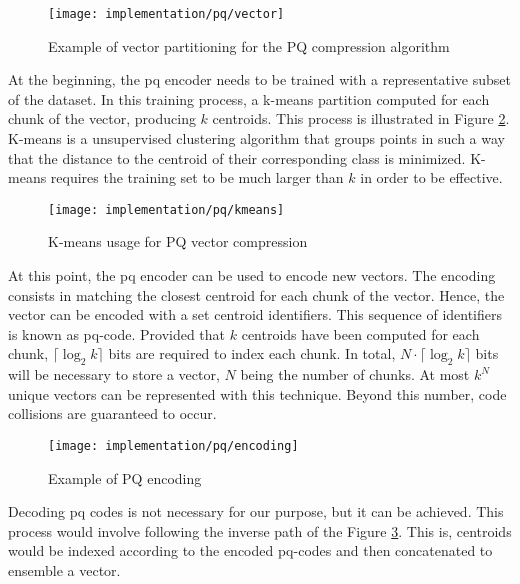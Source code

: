 \documentclass[../main.tex]{subfiles}
\begin{document}
\begin{figure}[htbp]
    \centering
    \texttt{[image: implementation/pq/vector]}
    \caption{Example of vector partitioning for the PQ compression algorithm}
    \label{fig:4:pq_division}
\end{figure}

At the beginning, the \gls{pq} encoder needs to be trained with a representative subset of the dataset. In this training process, a k-means partition computed for each chunk of the vector, producing $k$ centroids. This process is illustrated in Figure \ref{fig:4:pq_kmeans}. K-means is a unsupervised clustering algorithm that groups points in such a way that the distance to the centroid of their corresponding class is minimized\cite{sontag2012}. K-means requires the training set to be much larger than $k$ in order to be effective.

\begin{figure}[htbp]
    \centering
    \texttt{[image: implementation/pq/kmeans]}
    \caption{K-means usage for PQ vector compression}
    \label{fig:4:pq_kmeans}
\end{figure}

At this point, the \gls{pq} encoder can be used to encode new vectors. The encoding consists in matching the closest centroid for each chunk of the vector. Hence, the vector can be encoded with a set centroid identifiers. This sequence of identifiers is known as \gls{pq}-code\cite{chang2022a}. Provided that $k$ centroids have been computed for each chunk, $\lceil \log_2 k \rceil$ bits are required to index each chunk. In total, $N \cdot \lceil \log_2 k \rceil$ bits will be necessary to store a vector, $N$ being the number of chunks\cite{briggs2022}. At most $k^N$ unique vectors can be represented with this technique. Beyond this number, code collisions are guaranteed to occur.

\begin{figure}[htbp]
    \centering
    \texttt{[image: implementation/pq/encoding]}
    \caption{Example of PQ encoding}
    \label{fig:4:pq_encoding}
\end{figure}

Decoding \gls{pq} codes is not necessary for our purpose, but it can be achieved. This process would involve following the inverse path of the Figure \ref{fig:4:pq_encoding}. This is, centroids would be indexed according to the encoded \gls{pq}-codes and then concatenated to ensemble a vector.
\end{document}

